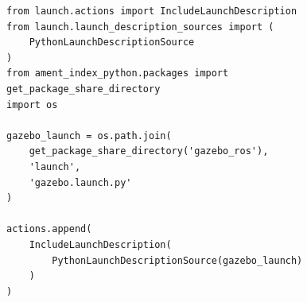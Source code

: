 \begin{figure}[t]
\centering
\begin{lstlisting}[style=python,
    caption={Inclusión de gazebo.launch.py desde el launch padre.},
    label={lst:include_gazebo}]
from launch.actions import IncludeLaunchDescription
from launch.launch_description_sources import (
    PythonLaunchDescriptionSource
)
from ament_index_python.packages import get_package_share_directory
import os

gazebo_launch = os.path.join(
    get_package_share_directory('gazebo_ros'),
    'launch',
    'gazebo.launch.py'
)

actions.append(
    IncludeLaunchDescription(
        PythonLaunchDescriptionSource(gazebo_launch)
    )
)
\end{lstlisting}
\end{figure}
